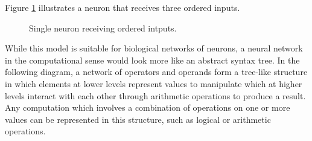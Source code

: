 \documentclass{article}
\begin{document}
 Figure \ref{fig:sig-neuron} illustrates a neuron that receives three ordered inputs. 

 
 \begin{figure}[!htb]

 \centering
 \caption{Single neuron receiving ordered intputs. \label{fig:sig-neuron}}
\end{figure}


While this model is suitable for biological networks of neurons, a neural network in the computational sense would look more like an abstract syntax tree. In the following diagram, a network of operators and operands form a tree-like structure in which elements at lower levels represent values to manipulate which at higher levels interact with each other through arithmetic operations to produce a result. Any computation which involves a combination of operations on one or more values can be represented in this structure, such as logical or arithmetic operations.
\end{document}

